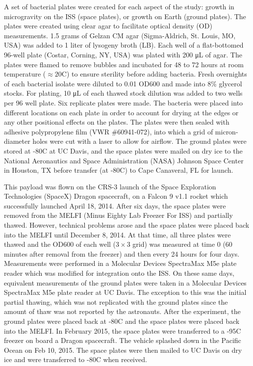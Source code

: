 A set of bacterial plates were created for each aspect of the study: growth in microgravity on the ISS (space plates), or growth on Earth (ground plates). The plates were created using clear agar to facilitate optical density (OD) measurements. 1.5 grams of Gelzan CM agar (Sigma-Aldrich, St. Louis, MO, USA) was added to 1 liter of lysogeny broth (LB). Each well of a flat-bottomed 96-well plate (Costar, Corning, NY, USA) was plated with 200 \si{\micro\liter} of agar. The plates were flamed to remove bubbles and incubated for 48 to 72 hours at room temperature ($\approx 20$\degree C) to ensure sterility before adding bacteria. Fresh overnights of each bacterial isolate were diluted to 0.01 OD600 and made into 8\% glycerol stocks. For plating, 10 \si{\micro\liter} of each thawed stock dilution was added to two wells per 96 well plate. Six replicate plates were made. The bacteria were placed into different locations on each plate in order to account for drying at the edges or any other positional effects on the plates. The plates were then sealed with adhesive polypropylene film (VWR \#60941-072), into which a grid of micron-diameter holes were cut with a laser to allow for airflow. The ground plates were stored at -80\degree C at UC Davis, and the space plates were mailed on dry ice to the National Aeronautics and Space Administration (NASA) Johnson Space Center in Houston, TX before transfer (at -80\degree C) to Cape Canaveral, FL for launch.

This payload was flown on the CRS-3 launch of the Space Exploration Technologies (SpaceX) Dragon spacecraft, on a Falcon 9 v1.1 rocket which successfully launched April 18, 2014. After six days, the space plates were removed from the MELFI (Minus Eighty Lab Freezer For ISS) and partially thawed. However, technical problems arose and the space plates were placed back into the MELFI until December 8, 2014. At that time, all three plates were thawed and the OD600 of each well ($3\times 3$ grid) was measured at time 0 (60 minutes after removal from the freezer) and then every 24 hours for four days. Measurements were performed in a Molecular Devices SpectraMax M5e plate reader which was modified for integration onto the ISS. On these same days, equivalent measurements of the ground plates were taken in a Molecular Devices SpectraMax M5e plate reader at UC Davis. The exception to this was the initial partial thawing, which was not replicated with the ground plates since the amount of thaw was not reported by the astronauts. After the experiment, the ground plates were placed back at -80\degree C and the space plates were placed back into the MELFI. In February 2015, the space plates were transferred to a -95\degree C freezer on board a Dragon spacecraft. The vehicle splashed down in the Pacific Ocean on Feb 10, 2015. The space plates were then mailed to UC Davis on dry ice and were transferred to -80\degree C when received.

